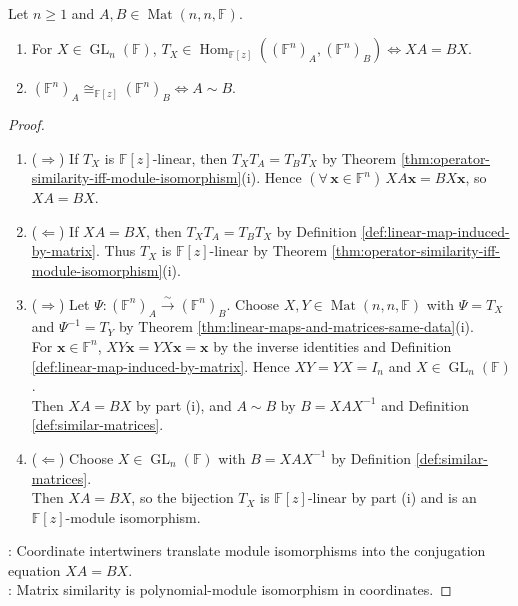 \begin{corollary} \label{cor:matrix-similarity-iff-matrix-modules-isomorphic} \\
Let $n\geq1$ and $A,B\in\operatorname{Mat}(n,n,\mathbb{F})$.
\begin{enumerate}[label=(\roman*)]
\setlength{\itemsep}{0pt}
\item For $X\in\operatorname{GL}_n(\mathbb{F})$, $T_X\in\operatorname{Hom}_{\mathbb{F}[z]}((\mathbb{F}^n)_A,(\mathbb{F}^n)_B)\Longleftrightarrow XA=BX$.
\item $(\mathbb{F}^n)_A\cong_{\mathbb{F}[z]}(\mathbb{F}^n)_B\Longleftrightarrow A\sim B$.
\end{enumerate}
\begin{proof}
\begin{enumerate}[label=(\roman*)]
\setlength{\itemsep}{0pt}
\item[$(i)$] ($\Rightarrow$) If $T_X$ is $\mathbb{F}[z]$-linear, then $T_XT_A=T_BT_X$ by Theorem \ref{thm:operator-similarity-iff-module-isomorphism}(i). Hence $(\forall\,\mathbf{x}\in\mathbb{F}^n)\,XA\mathbf{x}=BX\mathbf{x}$, so $XA=BX$.
\item[$(i)$] ($\Leftarrow$) If $XA=BX$, then $T_XT_A=T_BT_X$ by Definition \ref{def:linear-map-induced-by-matrix}. Thus $T_X$ is $\mathbb{F}[z]$-linear by Theorem \ref{thm:operator-similarity-iff-module-isomorphism}(i).
\item[$(ii)$] ($\Rightarrow$) Let $\Psi:(\mathbb{F}^n)_A\xrightarrow{\sim}(\mathbb{F}^n)_B$. Choose $X,Y\in\operatorname{Mat}(n,n,\mathbb{F})$ with $\Psi=T_X$ and $\Psi^{-1}=T_Y$ by Theorem \ref{thm:linear-maps-and-matrices-same-data}(i).\\
For $\mathbf{x}\in\mathbb{F}^n$, $XY\mathbf{x}=YX\mathbf{x}=\mathbf{x}$ by the inverse identities and Definition \ref{def:linear-map-induced-by-matrix}. Hence $XY=YX=I_n$ and $X\in\operatorname{GL}_n(\mathbb{F})$.\\
Then $XA=BX$ by part (i), and $A\sim B$ by $B=XAX^{-1}$ and Definition \ref{def:similar-matrices}.
\item[$(ii)$] ($\Leftarrow$) Choose $X\in\operatorname{GL}_n(\mathbb{F})$ with $B=XAX^{-1}$ by Definition \ref{def:similar-matrices}.\\
Then $XA=BX$, so the bijection $T_X$ is $\mathbb{F}[z]$-linear by part (i) and is an $\mathbb{F}[z]$-module isomorphism.
\end{enumerate}
: Coordinate intertwiners translate module isomorphisms into the conjugation equation $XA=BX$.\\
: Matrix similarity is polynomial-module isomorphism in coordinates.
\end{proof}
\end{corollary}


